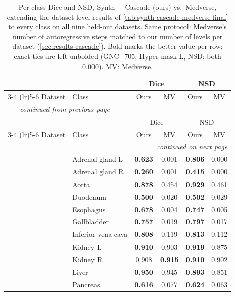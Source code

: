 \begin{longtable}{@{}llcccc@{}}
  \caption{Per-class Dice and NSD, Synth + Cascade (ours) vs.\ Medverse,
  extending the dataset-level results of
  \autoref{tab:synth-cascade-medverse-final} to every class on all nine
  held-out datasets. Same protocol: Medverse's number of autoregressive steps
  matched to our number of levels per dataset
  (\autoref{sec:results-cascade}). Bold marks the better value per row; exact
  ties are left unbolded (GNC\_705, Hyper mask L, NSD: both 0.000). MV:
  Medverse.}
  \label{tab:synth-cascade-medverse-perclass} \\
  \toprule
  & & \multicolumn{2}{c}{Dice} & \multicolumn{2}{c}{NSD} \\
  \cmidrule(lr){3-4} \cmidrule(lr){5-6}
  Dataset & Class & Ours & MV & Ours & MV \\
  \midrule
  \endfirsthead
  \multicolumn{6}{l}{\textit{\tablename\ \thetable{} -- continued from previous page}} \\
  \toprule
  & & \multicolumn{2}{c}{Dice} & \multicolumn{2}{c}{NSD} \\
  \cmidrule(lr){3-4} \cmidrule(lr){5-6}
  Dataset & Class & Ours & MV & Ours & MV \\
  \midrule
  \endhead
  \midrule
  \multicolumn{6}{r}{\textit{continued on next page}} \\
  \endfoot
  \bottomrule
  \endlastfoot
  \multirow{13}{*}{FLARE22} & Adrenal gland L & \textbf{0.623} & 0.001 & \textbf{0.806} & 0.000 \\
   & Adrenal gland R & \textbf{0.260} & 0.001 & \textbf{0.415} & 0.000 \\
   & Aorta & \textbf{0.878} & 0.454 & \textbf{0.929} & 0.461 \\
   & Duodenum & \textbf{0.500} & 0.020 & \textbf{0.502} & 0.029 \\
   & Esophagus & \textbf{0.678} & 0.004 & \textbf{0.747} & 0.005 \\
   & Gallbladder & \textbf{0.757} & 0.019 & \textbf{0.797} & 0.017 \\
   & Inferior vena cava & \textbf{0.808} & 0.119 & \textbf{0.813} & 0.112 \\
   & Kidney L & \textbf{0.910} & 0.903 & \textbf{0.919} & 0.875 \\
   & Kidney R & 0.908 & \textbf{0.915} & \textbf{0.910} & 0.902 \\
   & Liver & \textbf{0.950} & 0.945 & \textbf{0.893} & 0.851 \\
   & Pancreas & \textbf{0.616} & 0.077 & \textbf{0.624} & 0.063 \\

\end{longtable}
